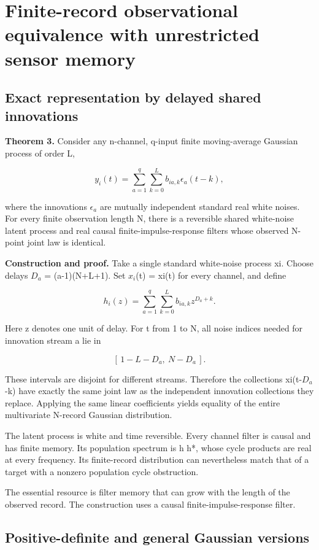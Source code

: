 \documentclass[11pt,a4paper]{article}
\begin{document}
\section{Finite-record observational equivalence with unrestricted sensor memory}

\subsection{Exact representation by delayed shared innovations}

\textbf{Theorem 3.} Consider any n-channel, q-input finite moving-average Gaussian process of order L,

\[y_i(t)=\sum_{a=1}^{q}\sum_{k=0}^{L}b_{ia,k}\epsilon_a(t-k),\]

where the innovations $\epsilon_{a}$ are mutually independent standard real white noises. For every finite observation length N, there is a reversible shared white-noise latent process and real causal finite-impulse-response filters whose observed N-point joint law is identical.

\textbf{Construction and proof.} Take a single standard white-noise process xi. Choose delays $D_{a}$ = (a-1)(N+L+1). Set $x_{i}$(t) = xi(t) for every channel, and define

\[h_i(z)=\sum_{a=1}^{q}\sum_{k=0}^{L}b_{ia,k}z^{D_a+k}.\]

Here z denotes one unit of delay. For t from 1 to N, all noise indices needed for innovation stream a lie in

\[[\,1-L-D_a,\ N-D_a\,].\]

These intervals are disjoint for different streams. Therefore the collections xi(t-$D_{a}$-k) have exactly the same joint law as the independent innovation collections they replace. Applying the same linear coefficients yields equality of the entire multivariate N-record Gaussian distribution.

The latent process is white and time reversible. Every channel filter is causal and has finite memory. Its population spectrum is h h*, whose cycle products are real at every frequency. Its finite-record distribution can nevertheless match that of a target with a nonzero population cycle obstruction.

The essential resource is filter memory that can grow with the length of the observed record. The construction uses a causal finite-impulse-response filter.

\subsection{Positive-definite and general Gaussian versions}
\end{document}
